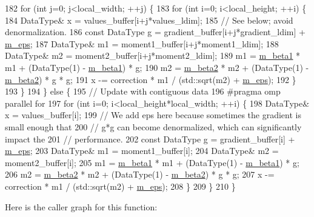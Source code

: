 \begin{DoxyCode}
182     \textcolor{keywordflow}{for} (\textcolor{keywordtype}{int} j=0; j<local\_width; ++j) \{
183       \textcolor{keywordflow}{for} (\textcolor{keywordtype}{int} i=0; i<local\_height; ++i) \{
184         DataType& x = values\_buffer[i+j*values\_ldim];
185         \textcolor{comment}{// See below; avoid denormalization.}
186         \textcolor{keyword}{const} DataType g = gradient\_buffer[i+j*gradient\_ldim] + \hyperlink{classlbann_1_1adam_a751102f0fd866612f5685050a08020a9}{m\_eps};
187         DataType& m1 = moment1\_buffer[i+j*moment1\_ldim];
188         DataType& m2 = moment2\_buffer[i+j*moment2\_ldim];
189         m1 = \hyperlink{classlbann_1_1adam_a73af15a28066edbfad9ba6a900746a19}{m\_beta1} * m1 + (DataType(1) - \hyperlink{classlbann_1_1adam_a73af15a28066edbfad9ba6a900746a19}{m\_beta1}) * g;
190         m2 = \hyperlink{classlbann_1_1adam_ab1f2a16b8eb7e265895ea9eef3fe87b2}{m\_beta2} * m2 + (DataType(1) - \hyperlink{classlbann_1_1adam_ab1f2a16b8eb7e265895ea9eef3fe87b2}{m\_beta2}) * g * g;
191         x -= correction * m1 / (std::sqrt(m2) + \hyperlink{classlbann_1_1adam_a751102f0fd866612f5685050a08020a9}{m\_eps});
192       \}
193     \}
194   \} \textcolor{keywordflow}{else} \{
195     \textcolor{comment}{// Update with contiguous data}
196 \textcolor{preprocessor}{    #pragma omp parallel for}
197     \textcolor{keywordflow}{for} (\textcolor{keywordtype}{int} i=0; i<local\_height*local\_width; ++i) \{
198       DataType& x = values\_buffer[i];
199       \textcolor{comment}{// We add eps here because sometimes the gradient is small enough that}
200       \textcolor{comment}{// g*g can become denormalized, which can significantly impact the}
201       \textcolor{comment}{// performance.}
202       \textcolor{keyword}{const} DataType g = gradient\_buffer[i] + \hyperlink{classlbann_1_1adam_a751102f0fd866612f5685050a08020a9}{m\_eps};
203       DataType& m1 = moment1\_buffer[i];
204       DataType& m2 = moment2\_buffer[i];
205       m1 = \hyperlink{classlbann_1_1adam_a73af15a28066edbfad9ba6a900746a19}{m\_beta1} * m1 + (DataType(1) - \hyperlink{classlbann_1_1adam_a73af15a28066edbfad9ba6a900746a19}{m\_beta1}) * g;
206       m2 = \hyperlink{classlbann_1_1adam_ab1f2a16b8eb7e265895ea9eef3fe87b2}{m\_beta2} * m2 + (DataType(1) - \hyperlink{classlbann_1_1adam_ab1f2a16b8eb7e265895ea9eef3fe87b2}{m\_beta2}) * g * g;
207       x -= correction * m1 / (std::sqrt(m2) + \hyperlink{classlbann_1_1adam_a751102f0fd866612f5685050a08020a9}{m\_eps});
208     \}
209   \}
210 \}
\end{DoxyCode}
Here is the caller graph for this function\+:\nopagebreak

